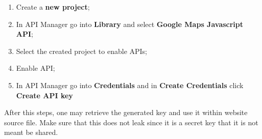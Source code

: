 \begin{enumerate}
	\item Create a \textbf{new project};
	\item In API Manager go into \textbf{Library} and select \textbf{Google Maps Javascript API};
	\item Select the created project to enable APIs;
	\item Enable API;
	\item In API Manager go into \textbf{Credentials} and in \textbf{Create Credentials} click \textbf{Create API key}	
\end{enumerate}

After this steps, one may retrieve the generated key and use it within website source file. Make sure that this does not leak since it is a secret key that it is not meant be shared.